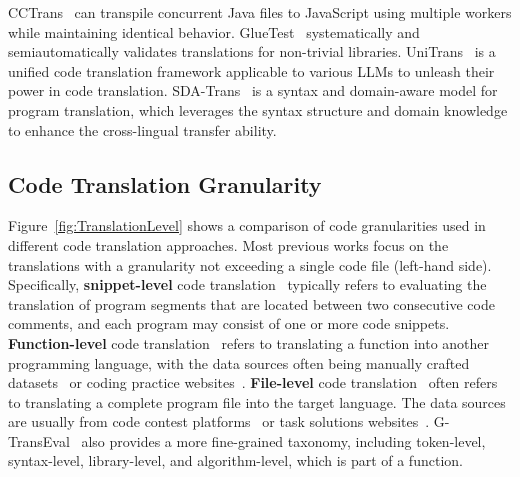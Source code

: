CCTrans~\cite{yang2024cctrans} can transpile concurrent Java files to JavaScript using multiple workers while maintaining identical behavior. 
GlueTest~\cite{abidgluetest} systematically and semiautomatically validates translations for non-trivial libraries. 
UniTrans~\cite{yang2024UniTrans} is a unified code translation framework applicable to various LLMs to unleash their power in code translation. SDA-Trans~\cite{liu2023syntax} is a syntax and domain-aware model for program translation, which leverages the syntax structure and domain knowledge to enhance the cross-lingual transfer ability.


\subsection{Code Translation Granularity}

Figure~\ref{fig:TranslationLevel} shows a comparison of code granularities used in different code translation approaches. Most previous works focus on the translations with a granularity not exceeding a single code file (left-hand side). Specifically, \textbf{snippet-level} code translation~\cite{Zhu2022CoST,zhu2022xlcost} typically refers to evaluating the translation of program segments that are located between two consecutive code comments, and each program may consist of one
or more code snippets. \textbf{Function-level} code translation~\cite{lachaux2020transcoder,Zhu2022CoST,zhu2022xlcost,humanevalx,lu2021codexglue} refers to translating a function into another programming language, with the data sources often being manually crafted datasets~\cite{humaneval} or coding practice websites~\cite{geeksforgeeks}. \textbf{File-level} code translation~\cite{puri2021codenet,ahmad2021avatar,khan2023xcodeeval,yan2023codescope,yan2023codetransocean,yin2024rectifier} often refers to translating a complete program file into the target language. The data sources are usually from code contest platforms~\cite{Codeforces,atcoder,aizu,GoogleCodeJam} or task solutions websites~\cite{dotnetsamples,d2lai,rosettacode}. G-TransEval~\cite{jiao2023GTransEval} also provides a more fine-grained taxonomy, including token-level, syntax-level, library-level, and algorithm-level, which is part of a function. 

